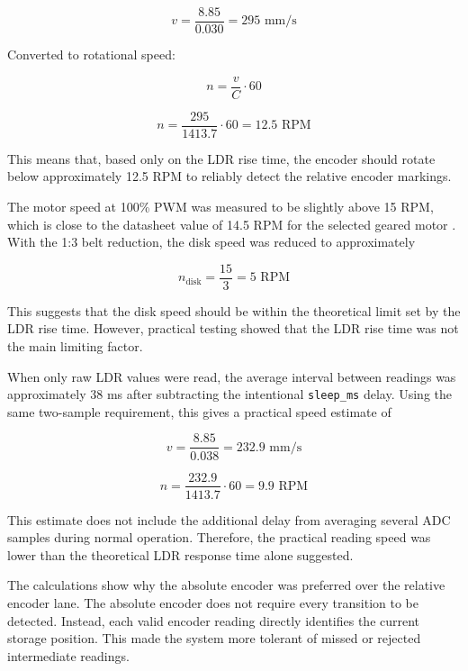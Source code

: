 \[
v = \frac{8.85}{0.030} = 295 \text{ mm/s}
\]

Converted to rotational speed:

\[
n = \frac{v}{C} \cdot 60
\]

\[
n = \frac{295}{1413.7} \cdot 60 = 12.5 \text{ RPM}
\]

This means that, based only on the LDR rise time, the encoder should rotate below approximately 12.5 RPM to reliably detect the relative encoder markings.


The motor speed at 100\% PWM was measured to be slightly above 15 RPM, which is close to the datasheet value of 14.5 RPM for the selected geared motor \cite{nidec_hg37_datasheet}. With the 1:3 belt reduction, the disk speed was reduced to approximately

\[
n_\text{disk} = \frac{15}{3} = 5 \text{ RPM}
\]

This suggests that the disk speed should be within the theoretical limit set by the LDR rise time. However, practical testing showed that the LDR rise time was not the main limiting factor.

When only raw LDR values were read, the average interval between readings was approximately 38 ms after subtracting the intentional \texttt{sleep\_ms} delay. Using the same two-sample requirement, this gives a practical speed estimate of

\[
v = \frac{8.85}{0.038} = 232.9 \text{ mm/s}
\]

\[
n = \frac{232.9}{1413.7} \cdot 60 = 9.9 \text{ RPM}
\]

This estimate does not include the additional delay from averaging several ADC samples during normal operation. Therefore, the practical reading speed was lower than the theoretical LDR response time alone suggested.

The calculations show why the absolute encoder was preferred over the relative encoder lane. The absolute encoder does not require every transition to be detected. Instead, each valid encoder reading directly identifies the current storage position. This made the system more tolerant of missed or rejected intermediate readings.